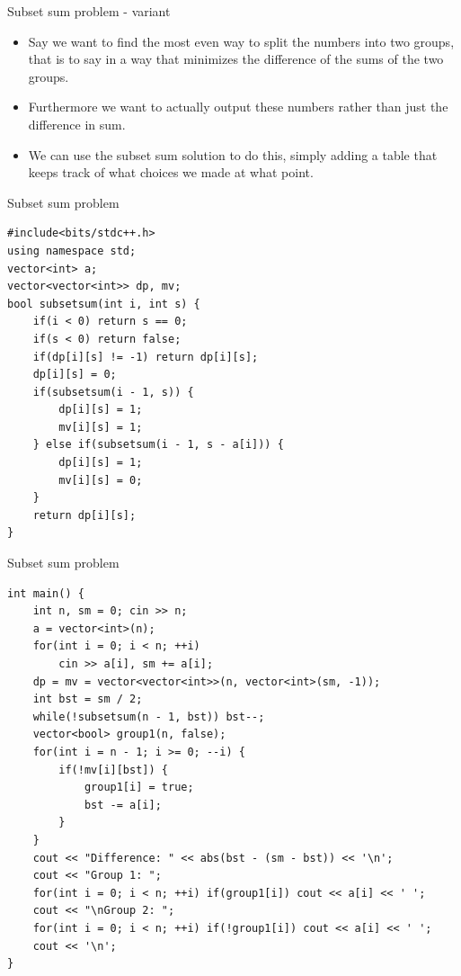 \documentclass{beamer}
\begin{document}
\begin{frame}[plain]{Subset sum problem - variant}
    \vspace{10pt}

    \begin{itemize}
        \item Say we want to find the most even way to split the numbers into two groups, that is to say in a way that minimizes the difference of the sums of the two groups.
        
        \item Furthermore we want to actually output these numbers rather than just the difference in sum.
        
        \item We can use the subset sum solution to do this, simply adding a table that keeps track of what choices we made at what point.
    \end{itemize}
\end{frame}

\begin{frame}{Subset sum problem}
    \begin{verbatim}
#include<bits/stdc++.h>
using namespace std;
vector<int> a;
vector<vector<int>> dp, mv;
bool subsetsum(int i, int s) {
	if(i < 0) return s == 0;
	if(s < 0) return false;
    if(dp[i][s] != -1) return dp[i][s];
    dp[i][s] = 0;
    if(subsetsum(i - 1, s)) {
        dp[i][s] = 1;
        mv[i][s] = 1;
    } else if(subsetsum(i - 1, s - a[i])) {
        dp[i][s] = 1;
        mv[i][s] = 0;
    }
	return dp[i][s];
}
    \end{verbatim}
\end{frame}

\begin{frame}{Subset sum problem}
    \begin{verbatim}
int main() {
	int n, sm = 0; cin >> n;
	a = vector<int>(n);
	for(int i = 0; i < n; ++i)
		cin >> a[i], sm += a[i];
	dp = mv = vector<vector<int>>(n, vector<int>(sm, -1));
	int bst = sm / 2;
	while(!subsetsum(n - 1, bst)) bst--;
	vector<bool> group1(n, false);
	for(int i = n - 1; i >= 0; --i) {
		if(!mv[i][bst]) {
			group1[i] = true;
			bst -= a[i];
		}
	}
	cout << "Difference: " << abs(bst - (sm - bst)) << '\n';
	cout << "Group 1: ";
	for(int i = 0; i < n; ++i) if(group1[i]) cout << a[i] << ' ';
	cout << "\nGroup 2: ";
	for(int i = 0; i < n; ++i) if(!group1[i]) cout << a[i] << ' ';
	cout << '\n';
}
    \end{verbatim}
\end{frame}
\end{document}
